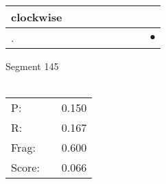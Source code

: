 \documentclass[landscape]{article}
\newcommand{\ssp}{\hspace{2pt}}
\newcommand{\mex}{\cellcolor{g}$\bullet$}
\begin{document}
\begin{tabular}{|l|p{10pt}|p{10pt}|p{10pt}|p{10pt}|p{10pt}|p{10pt}|p{10pt}|p{10pt}|}
\hline
\ssp clockwise \ssp&\hspace{2pt}&\hspace{2pt}&\hspace{2pt}&\hspace{2pt}&\hspace{2pt}&\hspace{2pt}&\hspace{2pt}&\hspace{2pt}\\
\hline
\ssp \cellcolor{ref7}. \ssp&\hspace{2pt}&\hspace{2pt}&\hspace{2pt}&\hspace{2pt}&\hspace{2pt}&\hspace{2pt}&\hspace{2pt}&\hspace{2pt}\mex\\
\hline
\end{tabular}

\vspace{6pt}
\noindent Segment 145\\\\
\noindent\begin{tabular}{lm{12pt}r}
\hline
P:&&0.150\\
R:&&0.167\\
Frag:&&0.600\\
Score:&&0.066\\
\end{tabular}

\newpage
\end{document}
